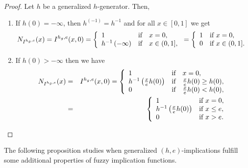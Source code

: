 \begin{proof}
	Let $h$ be a generalized $h$-generator. Then,
	\begin{enumerate}[label=(\roman*)]
		\item If $h(0)=-\infty$, then $h^{(-1)}=h^{-1}$ and for all $x\in [0,1]$ we get
		$$N_{I^{h_g,e}}(x)=I^{h_g,e}(x,0) =  \left\{ \begin{array}{lcl}
			1 &   \hbox{if}  & x=0,\\
			h^{-1}\left(-\infty\right) &  \hbox{if} & x \in (0,1],
		\end{array}
		\right.
		= \left\{ \begin{array}{ll}
			1   &   \text{if } x=0,\\
			0  &   \text{if } x \in (0,1].
		\end{array}
		\right.
		$$
		\item If $h(0)>-\infty$ then we have
		\begin{eqnarray*}
			N_{I^{h_g,e}}(x)
			&=&
			I^{h_g,e}(x,0) =  \left\{ \begin{array}{lcl}
				1 &   \hbox{if}  & x=0,\\
				h^{-1}\left(\frac{x}{e}h(0)\right) &  \hbox{if} & \frac{x}{e}h(0) \geq h(0), \\
				0 &  \hbox{if} & \frac{x}{e}h(0) < h(0),
			\end{array}
			\right. \\
			&=& \left\{ \begin{array}{ll}
				1 &   \text{if } x=0,\\
				h^{-1}\left(\frac{x}{e}h(0)\right)&   \text{if } x \leq e, \\
				0 &   \text{if } x>e.
			\end{array}
			\right.
		\end{eqnarray*}
	\end{enumerate}	
\end{proof}

The following proposition studies when generalized $(h,e)$-implications fulfill some additional properties of fuzzy implication functions.

